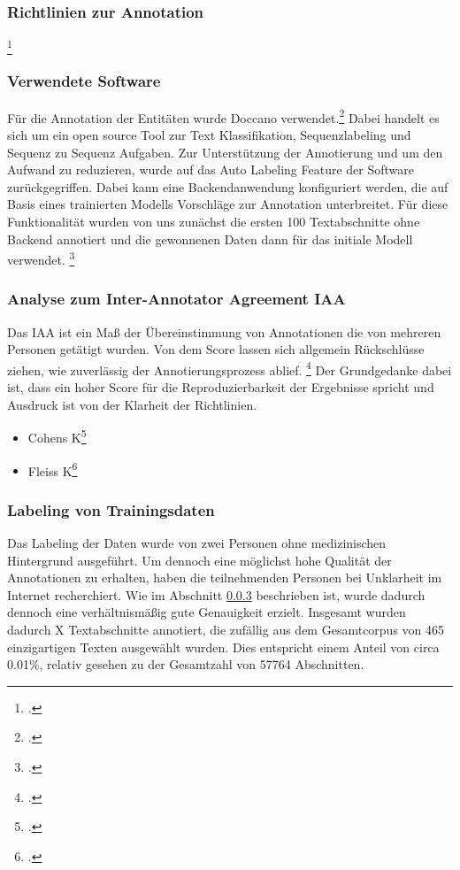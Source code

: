 \subsubsection{Richtlinien zur Annotation}
\footcite[vgl.][]{neves2014}

\subsubsection{Verwendete Software}
Für die Annotation der Entitäten wurde Doccano verwendet.\footcite[vgl.][S.]{hirokinakayama2021} Dabei handelt es sich um ein open source Tool zur Text Klassifikation, Sequenzlabeling und Sequenz zu Sequenz Aufgaben.
Zur Unterstützung der Annotierung und um den Aufwand zu reduzieren, wurde auf das Auto Labeling Feature der Software zurückgegriffen. Dabei kann eine Backendanwendung konfiguriert werden, die auf Basis eines trainierten Modells Vorschläge zur Annotation unterbreitet.
Für diese Funktionalität wurden von uns zunächst die ersten 100 Textabschnitte ohne Backend annotiert und die gewonnenen Daten dann für das initiale Modell verwendet.
\footcite[vgl.][]{neves2014a}

\subsubsection{Analyse zum Inter-Annotator Agreement \ac{IAA}}\label{sec:IAA}
Das \acf*{IAA} ist ein Maß der Übereinstimmung von Annotationen die von mehreren Personen getätigt wurden. Von dem Score lassen sich allgemein Rückschlüsse ziehen, wie zuverlässig der Annotierungsprozess ablief. \footcite[vgl.][S.298]{ide2017} Der Grundgedanke dabei ist, dass ein hoher Score für die Reproduzierbarkeit der Ergebnisse spricht und Ausdruck ist von der Klarheit der Richtlinien.

\begin{itemize}
    \item Cohens K\footcite[vgl.][S.]{cohen1960}
    \item Fleiss K\footcite[vgl.][S.]{fleiss1971}
\end{itemize}

\subsubsection{Labeling von Trainingsdaten}
Das Labeling der Daten wurde von zwei Personen ohne medizinischen Hintergrund ausgeführt. Um dennoch eine möglichst hohe Qualität der Annotationen zu erhalten, haben die teilnehmenden Personen bei Unklarheit im Internet recherchiert. Wie im Abschnitt \ref{sec:IAA} beschrieben ist, wurde dadurch dennoch eine verhältnismäßig gute Genauigkeit erzielt.
Insgesamt wurden dadurch X Textabschnitte annotiert, die zufällig aus dem Gesamtcorpus von 465 einzigartigen Texten ausgewählt wurden. Dies entspricht einem Anteil von circa 0.01\%, relativ gesehen zu der Gesamtzahl von 57764 Abschnitten.

